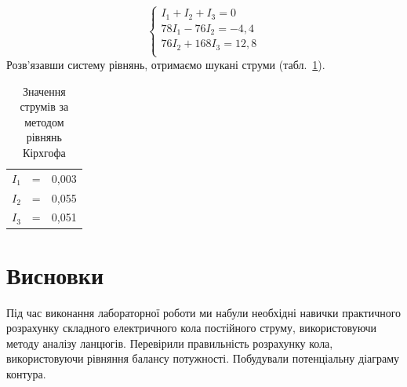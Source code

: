 \documentclass[a4paper,oneside,DIV=10,12pt]{scrartcl}
\begin{document}
			\[
				\begin{cases}
					I_1 + I_2 + I_3 = 0\\
					78 I_1 - 76 I_2 = -4{,}4\\
					76 I_2 + 168 I_3 = 12{,}8\\
				\end{cases}
			\]
			Розв'язавши систему рівнянь, отримаємо шукані струми (табл.~\ref{tab:kirchhoff-currents}).
			\begin{table}[!htbp]
			\centering
			\begin{tabular}{lcr}
				\toprule
					$I_1$ &=& 0{,}003\\
					$I_2$ &=& 0{,}055\\
					$I_3$ &=& 0{,}051\\
				\bottomrule
			\end{tabular}
			\caption{Значення струмів за методом рівнянь Кірхгофа}
			\label{tab:kirchhoff-currents}
			\end{table}

	\section{Висновки}
		Під час виконання лабораторної роботи ми набули необхідні навички практичного розрахунку складного електричного кола постійного струму, використовуючи методу аналізу ланцюгів. Перевірили правильність розрахунку кола, використовуючи рівняння балансу потужності. Побудували потенціальну діаграму контура.
	
\end{document}

